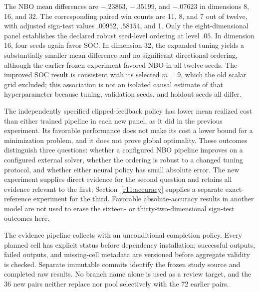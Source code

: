 The NBO mean differences are $-.23863$, $-.35199$, and $-.07623$ in dimensions 8, 16, and 32. The corresponding paired win counts are 11, 8, and 7 out of twelve, with adjusted sign-test values $.00952$, $.58154$, and 1. Only the eight-dimensional panel establishes the declared robust seed-level ordering at level $.05$. In dimension 16, four seeds again favor SOC. In dimension 32, the expanded tuning yields a substantially smaller mean difference and no significant directional ordering, although the earlier frozen experiment favored NBO in all twelve seeds. The improved SOC result is consistent with its selected $m=9$, which the old scalar grid excluded; this association is not an isolated causal estimate of that hyperparameter because tuning, validation seeds, and holdout seeds all differ.

The independently specified clipped-feedback policy has lower mean realized cost than either trained pipeline in each new panel, as it did in the previous experiment. Its favorable performance does not make its cost a lower bound for a minimization problem, and it does not prove global optimality. These outcomes distinguish three questions: whether a configured NBO pipeline improves on a configured external solver, whether the ordering is robust to a changed tuning protocol, and whether either neural policy has small absolute error. The new experiment supplies direct evidence for the second question and retains all evidence relevant to the first; Section~\ref{r11:accuracy} supplies a separate exact-reference experiment for the third. Favorable absolute-accuracy results in another model are not used to erase the sixteen- or thirty-two-dimensional sign-test outcomes here.

The evidence pipeline collects with an unconditional completion policy. Every planned cell has explicit status before dependency installation; successful outputs, failed outputs, and missing-cell metadata are versioned before aggregate validity is checked. Separate immutable commits identify the frozen study source and completed raw results. No branch name alone is used as a review target, and the 36 new pairs neither replace nor pool selectively with the 72 earlier pairs.
